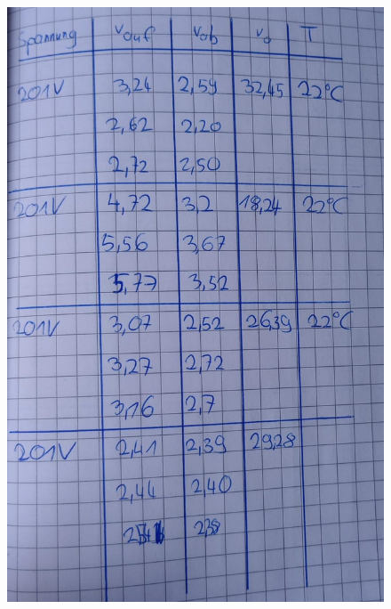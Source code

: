 \begin{figure}[H]
    \centering
    \includegraphics[width=\textwidth]{Bilder/V503.2.jpeg}
\end{figure}

